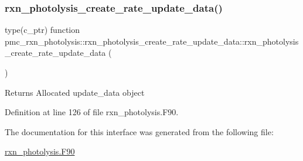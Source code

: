 \subsubsection{\texorpdfstring{rxn\+\_\+photolysis\+\_\+create\+\_\+rate\+\_\+update\+\_\+data()}{rxn\_photolysis\_create\_rate\_update\_data()}}
{\footnotesize\ttfamily type(c\+\_\+ptr) function pmc\+\_\+rxn\+\_\+photolysis\+::rxn\+\_\+photolysis\+\_\+create\+\_\+rate\+\_\+update\+\_\+data\+::rxn\+\_\+photolysis\+\_\+create\+\_\+rate\+\_\+update\+\_\+data (\begin{DoxyParamCaption}{ }\end{DoxyParamCaption})\hspace{0.3cm}{\ttfamily [private]}}

\begin{DoxyReturn}{Returns}
Allocated update\+\_\+data object 
\end{DoxyReturn}


Definition at line 126 of file rxn\+\_\+photolysis.\+F90.



The documentation for this interface was generated from the following file\+:\begin{DoxyCompactItemize}
\item 
\mbox{\hyperlink{rxn__photolysis_8_f90}{rxn\+\_\+photolysis.\+F90}}\end{DoxyCompactItemize}
